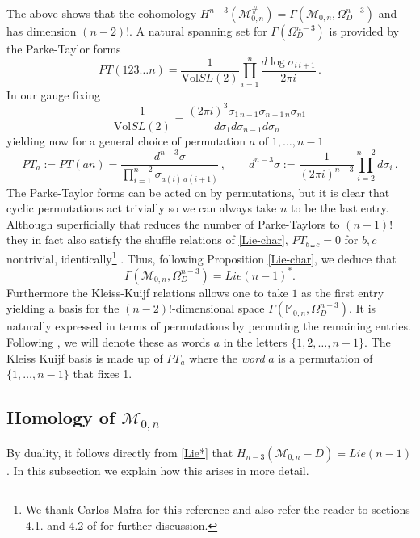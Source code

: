 \documentclass[11pt]{article}
\newcommand{\M}{\mathbb{M}}
\newcommand{\cM}{\mathcal{M}}
\newcommand{\1}{{\rm 1\hskip-0.25em I}}
\begin{document}
 The above shows that the cohomology $H^{n-3}(\cM_{0,n}^\#)=\Gamma (\cM_{0,n},\Omega^{n-3}_D)$ and has dimension $(n-2)!$.  A natural spanning set for 
 $\Gamma(\Omega^{n-3}_D)$ is provided by the Parke-Taylor forms  
\begin{equation}
PT(123\ldots n)=\frac{1}{\mathrm{Vol}SL(2)} \prod_{i=1}^n \frac{d\log \sigma_{i\, i+1}}{2\pi i}\, .
\end{equation}
In our gauge fixing 
\begin{equation}
\frac{1}{\mathrm{Vol}SL(2)}=\frac{(2\pi i)^3\sigma_{1\, n-1}\sigma_{n-1\, n}\sigma_{n1}}{d\sigma_1d\sigma_{n-1} d\sigma_n}
\end{equation}
yielding now for a general choice of permutation $a$ of $1,\ldots ,n-1$
\begin{equation}
PT_a:=PT(a n)=\frac{d^{n-3}\sigma }{\prod_{i=1}^{n-2} 
\sigma_{{a(i)\, a(i+1)}}} \, , \qquad d^{n-3}\sigma:=\frac{1}{(2\pi i)^{n-3}}\prod_{i=2}^{n-2} d\sigma_i\, .
\end{equation}
The Parke-Taylor forms can be acted on by permutations, but it is clear that cyclic permutations act trivially so we can always take $n$ to be the last entry. Although superficially that reduces the number of Parke-Taylors to $(n-1)!$ they in fact also satisfy the shuffle relations of \ref{Lie-char}, $PT_{b\shuffle c}=0$ for $b,c$ nontrivial, identically\footnote{We thank Carlos Mafra for this reference and also refer the reader to sections 4.1. and 4.2 of  \cite{Mafra:2015vca} for further discussion.} \cite{Cresson:2006}.
Thus, following Proposition \ref{Lie-char}, we deduce that 
\begin{equation}
\Gamma(\cM_{0,n},\Omega^{n-3}_D)=Lie(n-1)^*. \label{Lie*}
\end{equation}
  Furthermore the Kleiss-Kuijf relations allows one to take $1$ as the first entry yielding a basis for the $(n-2)!$-dimensional space $\Gamma(\M_{0,n},\Omega^{n-3}_D)$. It is naturally expressed in terms of permutations  by permuting the remaining entries. Following \cite{Reutenauer}, we will denote these as words $a$ in the letters $\{1,2,\ldots ,n-1\}$. The Kleiss Kuijf basis is made up of $PT_a$ where the \emph{word} $a$ is a permutation of $\{1,\ldots, n-1\}$ that fixes 1.



\subsection{Homology of $\cM_{0,n}$}
By duality, it follows directly from \eqref{Lie*} that $H_{n-3}(\cM_{0,n}-D)=Lie(n-1)$.  In this subsection we explain how this arises in more detail.
\end{document}
